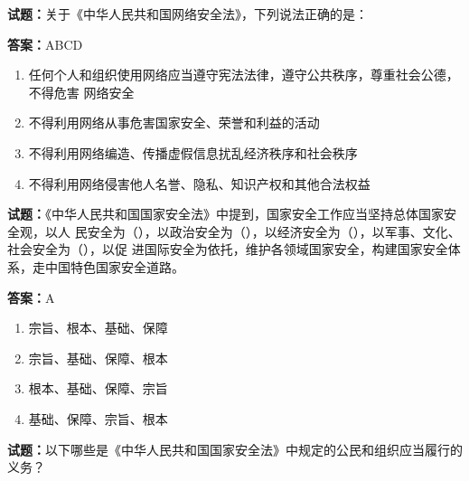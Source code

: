 \documentclass{ctexbook}
\begin{document}


\vspace{1em}

\textbf{试题：}关于《中华人民共和国网络安全法》，下列说法正确的是： 

\textbf{答案：}ABCD 

\begin{enumerate}[leftmargin=3em]
  \item 任何个人和组织使用网络应当遵守宪法法律，遵守公共秩序，尊重社会公德，不得危害
网络安全 

  \item 不得利用网络从事危害国家安全、荣誉和利益的活动 

  \item 不得利用网络编造、传播虚假信息扰乱经济秩序和社会秩序 

  \item 不得利用网络侵害他人名誉、隐私、知识产权和其他合法权益 

\end{enumerate}





\vspace{1em}

\textbf{试题：}《中华人民共和国国家安全法》中提到，国家安全工作应当坚持总体国家安全观，以人
民安全为（），以政治安全为（），以经济安全为（），以军事、文化、社会安全为（），以促
进国际安全为依托，维护各领域国家安全，构建国家安全体系，走中国特色国家安全道路。 

\textbf{答案：}A 

\begin{enumerate}[leftmargin=3em]
  \item 宗旨、根本、基础、保障 

  \item 宗旨、基础、保障、根本 

  \item 根本、基础、保障、宗旨 

  \item 基础、保障、宗旨、根本 

\end{enumerate}





\vspace{1em}

\textbf{试题：}以下哪些是《中华人民共和国国家安全法》中规定的公民和组织应当履行的义务？ 
\end{document}
